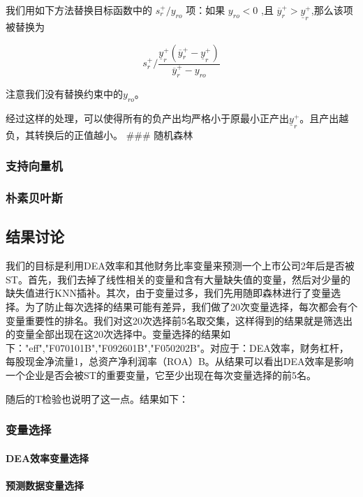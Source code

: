 \documentclass[]{article}
\begin{document}
我们用如下方法替换目标函数中的 $s_r^+/y_{ro}$ 项：如果 $y_{ro}<0$ ,且
$\overline{y}_{r}^{+}>\underline{y}_{r}^{+}$,那么该项被替换为

\[
s_r^{+}/\frac{\underline{y}_{r}^{+}(\overline{y}_{r}^{+}-\underline{y}_{r}^{+})}{\overline{y}_{r}^{+}-y_{ro}}
\]

注意我们没有替换约束中的$y_{ro}$。

经过这样的处理，可以使得所有的负产出均严格小于原最小正产出$\underline{y}_{r}^{+}$。且产出越负，其转换后的正值越小。
\#\#\# 随机森林

\subsubsection{支持向量机}

\subsubsection{朴素贝叶斯}

\subsection{结果讨论}
我们的目标是利用DEA效率和其他财务比率变量来预测一个上市公司2年后是否被ST。首先，我们去掉了线性相关的变量和含有大量缺失值的变量，然后对少量的缺失值进行KNN插补。其次，由于变量过多，我们先用随即森林进行了变量选择。为了防止每次选择的结果可能有差异，我们做了20次变量选择，每次都会有个变量重要性的排名。我们对这20次选择前5名取交集，这样得到的结果就是筛选出的变量全部出现在这20次选择中。变量选择的结果如下："eff","F070101B","F092601B","F050202B"。对应于：DEA效率，财务杠杆，每股现金净流量1，总资产净利润率（ROA）B。从结果可以看出DEA效率是影响一个企业是否会被ST的重要变量，它至少出现在每次变量选择的前5名。

随后的T检验也说明了这一点。结果如下：

\subsubsection{变量选择}

\paragraph{DEA效率变量选择}\label{dea}

\paragraph{预测数据变量选择}

\subsubsection{}\label{section}
\end{document}
